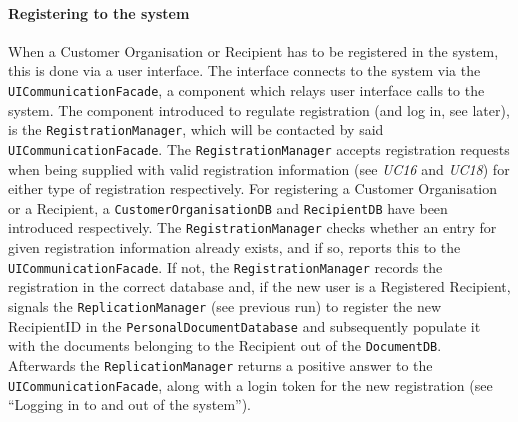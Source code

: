 \documentclass[a4paper,10pt]{article}
\begin{document}
\paragraph{Registering to the system}
When a Customer Organisation or Recipient has to be registered in the system, this is done via a user interface. The interface connects to the system via the \texttt{UICommunicationFacade}, a component which relays user interface calls to the system. The component introduced to regulate registration (and log in, see later), is the \texttt{RegistrationManager}, which will be contacted by said \texttt{UICommunicationFacade}. The \texttt{RegistrationManager} accepts registration requests when being supplied with valid registration information (see \emph{UC16} and \emph{UC18}) for either type of registration respectively. For registering a Customer Organisation or a Recipient, a \texttt{CustomerOrganisationDB} and \texttt{RecipientDB} have been introduced respectively. The \texttt{RegistrationManager} checks whether an entry for given registration information already exists, and if so, reports this to the \texttt{UICommunicationFacade}. If not, the \texttt{RegistrationManager} records the registration in the correct database and, if the new user is a Registered Recipient, signals the \texttt{ReplicationManager} (see previous run) to register the new RecipientID in the \texttt{PersonalDocumentDatabase} and subsequently populate it with the documents belonging to the Recipient out of the \texttt{DocumentDB}. Afterwards the \texttt{ReplicationManager} returns a positive answer to the \texttt{UICommunicationFacade}, along with a login token for the new registration (see ``Logging in to and out of the system'').
\end{document}
